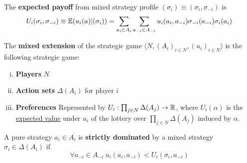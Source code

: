 \documentclass[11pt]{article}
\begin{document}
		\begin{proposition}
			The \textbf{expected payoff} from mixed strategy profile $(\sigma_i) \equiv (\sigma_i, \sigma_{-i})$ is
			\begin{equation}
				U_i(\sigma_i, \sigma_{-i}) \equiv \mathbb{E}({u_i(a)|(\sigma_i)}) = \sum_{a_i \in A_i} \sum_{a_{-i} \in A_{-i}} u_i(a_i, a_{-i}) \sigma_{-i}(a_{-i}) \sigma_i(a_i)
			\end{equation}
		\end{proposition}
		
		\begin{definition}
			The \textbf{mixed extension} of the strategic game $\langle N, (A_i)_{i\in N}, (u_i)_{i\in N} \rangle$ is the following strategic game:
			\begin{enumerate}[(i)]
				\item \textbf{Players} $N$
				\item \textbf{Action sets} $\Delta(A_i)$ for player $i$
				\item \textbf{Preferences} Represented by $U_i: \prod_{j \in N} \Delta(A_j) \to \mathbb{R}$, where $U_i(\alpha)$ is the \ul{expected value} under $u_i$ of the lottery over $\prod_{j \in N} \Delta(A_j)$ induced by $\alpha$.
			\end{enumerate}
		\end{definition}
		
		\begin{definition}
			A pure strategy $a_i \in A_i$ is \textbf{strictly dominated} by a mixed strategy $\sigma_i \in \Delta(A_i)$ if
			\begin{equation}
				\forall a_{-i} \in A_{-i}\ u_i(a_i, a_{-i}) < U_i(\sigma_i, a_{-i})
			\end{equation}
		\end{definition}
		
\end{document}
